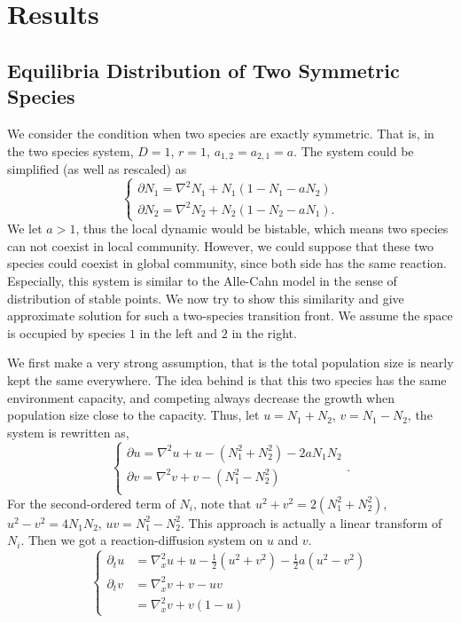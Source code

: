 \section{Results}

\subsection{Equilibria Distribution of Two Symmetric Species}

    We consider the condition when two species are exactly symmetric. That is, in the two species system, $D = 1$, $r = 1$, $a_{1,2} = a_{2,1} = a$. The system could be simplified (as well as rescaled) as
    \begin{equation*}
        \begin{cases}
            \partial N_{1} = \nabla^2 N_1 + N_1(1 - N_1 - a N_2)\\
            \partial N_{2} = \nabla^2 N_2 + N_2(1 - N_2 - a N_1).
        \end{cases}
    \end{equation*}
    We let $a > 1$, thus the local dynamic would be bistable, which means two species can not coexist in local community. However, we could suppose that these two species could coexist in global community, since both side has the same reaction. Especially, this system is similar to the Alle-Cahn model in the sense of distribution of stable points. We now try to show this similarity and give approximate solution for such a two-species transition front. We assume the space is occupied by species $1$ in the left and $2$ in the right.

    We first make a very strong assumption, that is the total population size is nearly kept the same everywhere. The idea behind is that this two species has the same environment capacity, and competing always decrease the growth when population size close to the capacity. Thus, let $u = N_1+N_2$, $v=N_1-N_2$, the system is rewritten as,
    \begin{equation*}
        \begin{cases}
            \partial u = \nabla^2 u + u - (N_1^2 + N_2^2) - 2 a N_1 N_2\\
            \partial v = \nabla^2 v + v - (N_1^2 - N_2^2)\\
        \end{cases}.
    \end{equation*}
    For the second-ordered term of $N_{i}$, note that $u^2 + v^2 = 2(N_1^2 + N_2^2)$,$u^2- v^2 = 4 N_1N_2$, $uv = N_1^2 - N_2^2$. This approach is actually a linear transform of $N_{i}$. Then we got a reaction-diffusion system on $u$ and $v$.
    \begin{equation*}
        \begin{cases}
            \partial_t u &= \nabla^2_x u + u - \frac{1}{2} (u^2 + v^2) - \frac{1}{2} a (u^2-v^2)\\
            \partial_t v &= \nabla^2_x v + v - u v \\
            &= \nabla^2_x v + v ( 1 - u)
        \end{cases}
    \end{equation*}

